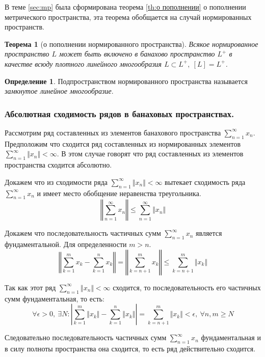 \documentclass[14pt,a4paper]{extarticle}
\newtheorem{theorem}{Теорема}[section]
\theoremstyle{definition}
\newtheorem{definition}{Определение}[section]
\theoremstyle{remark}
\renewcommand{\[}{\begin{dmath*}[compact]}
\renewcommand{\]}{\end{dmath*}}
\newcommand{\ds}{\displaystyle}
\newcommand{\sep}{ , \ \allowbreak }
\begin{document}
В теме \ref{sec:mp} была сформирована теорема \ref{th:о пополнении}
о пополнении метрического пространства,
эта теорема обобщается на случай нормированных пространств.

\begin{theorem}[о пополнении нормированного пространства]
\label{th:о пополнении нормированного пространства}
  Всякое нормированное пространство $L$ может быть включено в банахово
  пространство $L^+$ в качестве всюду плотного линейного многообразия
  $L \subset L^+ \sep [L]=L^+$.
\end{theorem}

\begin{definition}
  Подпространством нормированного пространства называется
  \textit{замкнутое линейное многообразие}.
\end{definition}

\subsubsection{Абсолютная сходимость рядов в банаховых пространствах.}

Рассмотрим ряд составленных из элементов банахового пространства
$\ds\sum_{n=1}^\infty x_n$.
Предположим что сходится ряд составленных из нормированных элементов
$\ds\sum_{n=1}^\infty \Vert x_n \Vert < \infty$.
В этом случае говорят что ряд составленных из элементов пространства
сходится абсолютно.

Докажем что из сходимости ряда $\ds\sum_{n=1}^\infty \Vert x_n \Vert < \infty$
вытекает сходимость ряда $\ds\sum_{n=1}^\infty x_n$ и имеет место обобщение
неравенства треугольника.
\[\left \Vert \sum_{n=1}^\infty x_n \right \Vert \leq
\sum_{n=1}^\infty \Vert x_n \Vert\]

Докажем что последовательность частичных сумм $\ds\sum_{n=1}^\infty x_n$ является
фундаментальной.
Для определенности $m>n$.
\[{\left \Vert \sum_{k=1}^m x_k - \sum_{k=1}^n x_k \right \Vert} \allowbreak
= {\left \Vert \sum_{k=n+1}^m x_k \right \Vert} \allowbreak
\leq {\sum_{k=n+1}^m \Vert x_k \Vert}\]

Так как этот ряд $\ds\sum_{n=1}^\infty \Vert x_n \Vert < \infty$ сходится,
то последовательность его частичных сумм фундаментальная, то есть:
\[ {\forall \epsilon > 0} \sep \exists N:
{\left| \sum_{k=1}^m \Vert x_k \Vert - \sum_{k=1}^n \Vert x_k \Vert \right|}
\allowbreak = {\sum_{k=n+1}^m \Vert x_k \Vert < \epsilon}
\sep {\forall n,m \geq N} \]

Следовательно последовательность частичных сумм $\sum_{n=1}^\infty x_n$
фундаментальная и в силу полноты пространства она сходится,
то есть ряд действительно сходится.
\end{document}
